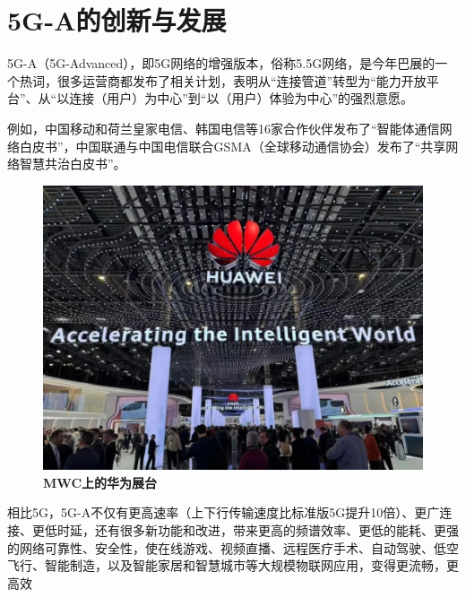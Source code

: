 \documentclass{article}
\begin{document}
\section*{5G-A的创新与发展}
5G-A（5G-Advanced），即5G网络的增强版本，俗称5.5G网络，是今年巴展的一个热词，很多运营商都发布了相关计划，表明从“连接管道”转型为“能力开放平台”、从“以连接（用户）为中心”到“以（用户）体验为中心”的强烈意愿。\par
例如，中国移动和荷兰皇家电信、韩国电信等16家合作伙伴发布了“智能体通信网络白皮书”，中国联通与中国电信联合GSMA（全球移动通信协会）发布了“共享网络智慧共治白皮书”。\par
\begin{figure}[H]
\begin{center}
\includegraphics[scale=0.3]{图1}
\caption{\textbf{MWC上的华为展台}}
\end{center}
\end{figure}
相比5G，5G-A不仅有更高速率（上下行传输速度比标准版5G提升10倍）、更广连接、更低时延，还有很多新功能和改进，带来更高的频谱效率、更低的能耗、更强的网络可靠性、安全性，使在线游戏、视频直播、远程医疗手术、自动驾驶、低空飞行、智能制造，以及智能家居和智慧城市等大规模物联网应用，变得更流畅，更高效\cite{news1}\par
\end{document}
